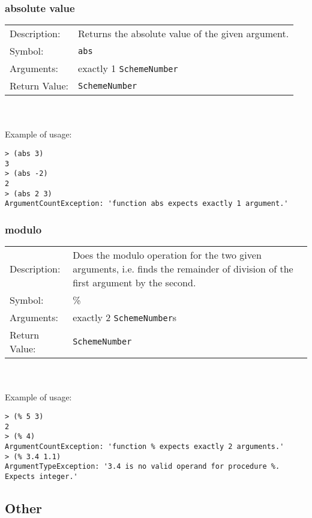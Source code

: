\documentclass[12pt,a4paper]{scrartcl}
\begin{document}
\subsubsection*{absolute value}
\begin{tabular}{l  p{13cm}}
Description: & Returns the absolute value of the given argument.\\
Symbol: & \lstinline{abs}\\
Arguments: & exactly 1 \lstinline{SchemeNumber}\\
Return Value: & \lstinline{SchemeNumber}
\end{tabular}
\\
\\
Example of usage:
\begin{lstlisting}
> (abs 3)
3
> (abs -2)
2
> (abs 2 3)
ArgumentCountException: 'function abs expects exactly 1 argument.'
\end{lstlisting}

\subsubsection*{modulo}
\begin{tabular}{l  p{13cm}}
Description: & Does the modulo operation for the two given arguments, i.e. finds the remainder of division of the first argument by the second.\\
Symbol: & \%\\
Arguments: & exactly 2 \lstinline{SchemeNumber}s\\
Return Value: & \lstinline{SchemeNumber}
\end{tabular}
\\
\\
Example of usage:
\begin{lstlisting}
> (% 5 3)
2
> (% 4)
ArgumentCountException: 'function % expects exactly 2 arguments.'
> (% 3.4 1.1)
ArgumentTypeException: '3.4 is no valid operand for procedure %. Expects integer.' 
\end{lstlisting}

\subsection*{Other}
\end{document}
